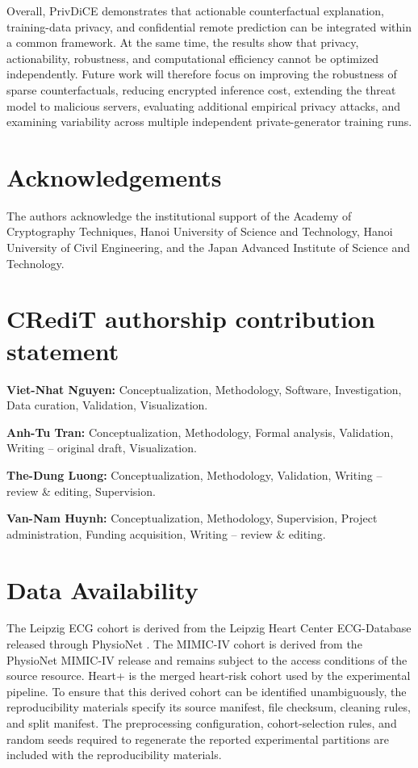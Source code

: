 \documentclass[preprint,12pt]{elsarticle}
\begin{document}
Overall, PrivDiCE demonstrates that actionable counterfactual explanation,
training-data privacy, and confidential remote prediction can be integrated
within a common framework. At the same time, the results show that privacy,
actionability, robustness, and computational efficiency cannot be optimized independently. Future work will therefore focus on improving the robustness of sparse counterfactuals, reducing encrypted inference cost, extending the threat
model to malicious servers, evaluating additional empirical privacy attacks,
and examining variability across multiple independent private-generator
training runs.

\section*{Acknowledgements}

The authors acknowledge the institutional support of the Academy of
Cryptography Techniques, Hanoi University of Science and Technology, Hanoi
University of Civil Engineering, and the Japan Advanced Institute of Science
and Technology.

\section*{CRediT authorship contribution statement}

\noindent
\textbf{Viet-Nhat Nguyen:}
Conceptualization, Methodology, Software, Investigation, Data curation,
Validation, Visualization.

\noindent
\textbf{Anh-Tu Tran:}
Conceptualization, Methodology, Formal analysis, Validation,
Writing -- original draft, Visualization.

\noindent
\textbf{The-Dung Luong:}
Conceptualization, Methodology, Validation, Writing -- review \& editing,
Supervision.

\noindent
\textbf{Van-Nam Huynh:}
Conceptualization, Methodology, Supervision, Project administration, Funding
acquisition, Writing -- review \& editing.

\section*{Data Availability}

The Leipzig ECG cohort is derived from the Leipzig Heart Center ECG-Database
released through PhysioNet
\cite{PhysioNet-leipzig-heart-center-ecg-1.0.0}. The MIMIC-IV cohort is
derived from the PhysioNet MIMIC-IV release
\cite{PhysioNet-mimiciv-2.2,johnson2023mimiciv} and remains subject to the
access conditions of the source resource. Heart+ is the merged heart-risk
cohort used by the experimental pipeline. To ensure that this derived cohort
can be identified unambiguously, the reproducibility materials specify its
source manifest, file checksum, cleaning rules, and split manifest. The
preprocessing configuration, cohort-selection rules, and random seeds required
to regenerate the reported experimental partitions are included with the
reproducibility materials.
\end{document}
